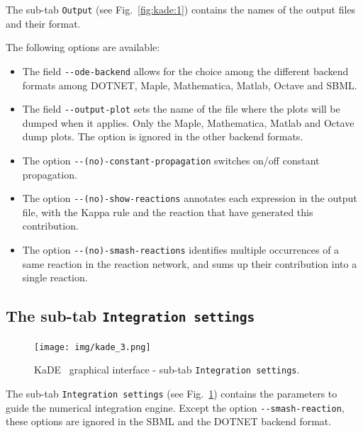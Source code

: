 \documentclass[11pt]{book}
\def\KaDE{\textsf{KaDE}}
\begin{document}
The sub-tab \texttt{Output} (see Fig.~\ref{fig:kade:1}) contains the names of the output files and their format.

The following options are available:
\begin{itemize}
\item The field \texttt{-{}-ode-backend} allows for the choice among the different backend formats among DOTNET, Maple, Mathematica, Matlab, Octave and SBML.
\item The field \texttt{-{}-output-plot} sets the name of the file where the plots will be dumped when it applies. Only the Maple, Mathematica, Matlab and Octave dump plots. The option is ignored in the other backend formats.
\item The option \texttt{-{}-(no)-constant-propagation} switches on/off constant propagation.
\item The option \texttt{-{}-(no)-show-reactions} annotates each expression in the output file, with the Kappa rule and the reaction that have generated this contribution.
\item The option \texttt{-{}-(no)-smash-reactions} identifies multiple occurrences of a same reaction in the reaction network, and sums up  their contribution into a single reaction.
\end{itemize}

\subsection{The sub-tab \texttt{Integration settings}}

\begin{figure}[htbp]
\centering
\texttt{[image: img/kade\_3.png]}
\caption{\KaDE~ graphical interface - sub-tab \texttt{Integration settings}.}
\label{fig:kade:3}
\end{figure}

The sub-tab \texttt{Integration settings} (see Fig.~\ref{fig:kade:3}) contains the parameters to guide the numerical integration engine. Except the option \texttt{-{}-smash-reaction}, these options are ignored in the SBML and the
DOTNET backend format.
\end{document}
